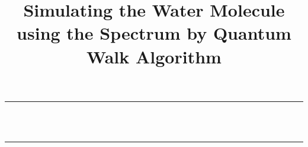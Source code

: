 \newcommand\email[1]{
    \href{mailto:#1}{\url{#1}}
}

\newcommand\authorblock[3]{
    #1\\
    \small{#2}\\
    \small{\email{#3}}
}

\newcommand\keywords[1]{
    \vspace{5mm}\noindent
    \small{\textbf{\textit{Keywords ---}} #1}
}

\title{Simulating the Water Molecule using the Spectrum by Quantum Walk Algorithm}




\begin{titlepage}
    \newcommand{\HRule}{\rule{\linewidth}{0.5mm}}

	\center

	\HRule\\[0.4cm]

	{\huge\bfseries \thetitle\\[0.4cm]}

	\HRule\\[1.5cm]


\end{titlepage}
